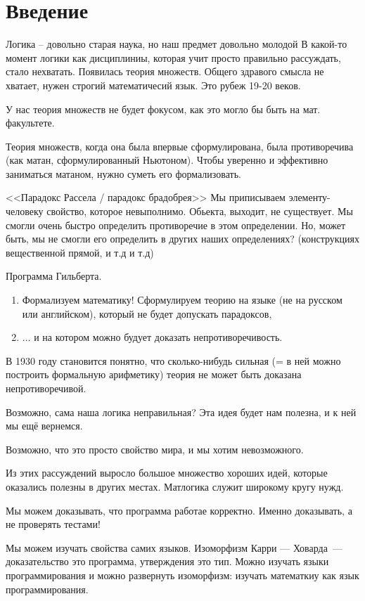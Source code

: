 \section{Введение}

Логика -- довольно старая наука, но наш предмет довольно молодой
В какой-то момент логики как дисциплиниы, которая учит просто правильно рассуждать, стало нехватать.
Появилась теория множеств.
Общего здравого смысла не хватает, нужен строгий математичесий язык.
Это рубеж 19-20 веков.

У нас теория множеств не будет фокусом, как это могло бы быть на мат. факультете.

Теория множеств, когда она была впервые сформулирована, была противоречива (как матан, сформулированный Ньютоном).
Чтобы уверенно и эффективно заниматься матаном, нужно суметь его формализовать.

<<Парадокс Рассела / парадокс брадобрея>>
Мы приписываем элементу-человеку свойство, которое невыполнимо.
Обьекта, выходит, не существует.
Мы смогли очень быстро определить противоречие в этом определении.
Но, может быть, мы не смогли его определить в других наших определениях?
(конструкциях вещественной прямой, и т.д и т.д)

Программа Гильберта.
\begin{enumerate}
\item Формализуем математику!
Сформулируем теорию на языке (не на русском или английском), который не будет допускать парадоксов,
\item $\ldots$ и на котором можно будует доказать непротиворечивость.
\end{enumerate}

В 1930 году становится понятно, что сколько-нибудь сильная (= в ней можно построить формальную арифметику) теория не может быть доказана непротиворечивой.

Возможно, сама наша логика неправильная?
Эта идея будет нам полезна, и к ней мы ещё вернемся.

Возможно, что это просто свойство мира, и мы хотим невозможного.

Из этих рассуждений выросло большое множество хороших идей, которые оказались полезны в других местах.
Матлогика служит широкому кругу нужд.

Мы можем доказывать, что программа работае корректно.
Именно доказывать, а не проверять тестами!

Мы можем изучать свойства самих языков.
Изоморфизм Карри — Ховарда~--- доказательство это программа, утверждения это тип.
Можно изучать языки программирования и можно развернуть изоморфизм: изучать математкиу как язык программирования.

